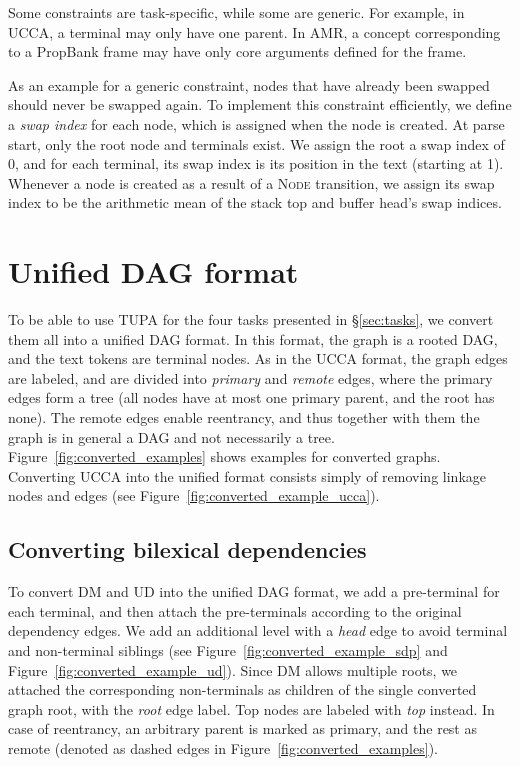 \documentclass[11pt,a4paper]{article}
\begin{document}
Some constraints are task-specific, while some are generic.
For example, in UCCA, a terminal may only have one parent.
In AMR, a concept corresponding to a PropBank frame may have only core arguments defined for the frame.

As an example for a generic constraint, nodes that have already been swapped
should never be swapped again.
To implement this constraint efficiently, we define a \textit{swap index}
for each node, which is assigned when the node is created.
At parse start, only the root node and terminals exist.
We assign the root a swap index of 0, and for each terminal, its swap index
is its position in the text (starting at 1).
Whenever a node is created as a result of a \textsc{Node}
transition, we assign its swap index to be the arithmetic mean of the stack top and buffer
head's swap indices.


\section{Unified DAG format}\label{sec:conversion}

To be able to use TUPA for the four tasks presented in \S\ref{sec:tasks},
we convert them all into a unified DAG format.
In this format, the graph is a rooted DAG, and the text tokens are terminal nodes.
As in the UCCA format, the graph edges are labeled,
and are divided into \textit{primary} and \textit{remote} edges,
where the primary edges form a tree (all nodes have at most one primary parent,
and the root has none).
The remote edges enable reentrancy, and thus together with them the graph
is in general a DAG and not necessarily a tree.
Figure~\ref{fig:converted_examples} shows examples for converted graphs.
Converting UCCA into the unified format consists simply of removing linkage nodes
and edges (see Figure~\ref{fig:converted_example_ucca}).

\subsection{Converting bilexical dependencies}
To convert DM and UD into the unified DAG format,
we add a pre-terminal for each terminal,
and then attach the pre-terminals according to the original dependency edges.
We add an additional level with a \textit{head} edge to avoid terminal and non-terminal siblings
(see Figure~\ref{fig:converted_example_sdp} and Figure~\ref{fig:converted_example_ud}).
Since DM allows multiple roots, we attached the corresponding non-terminals as children of
the single converted graph root, with the \textit{root} edge label.
Top nodes are labeled with \textit{top} instead.
In case of reentrancy, an arbitrary parent is marked as primary, and the rest as remote
(denoted as dashed edges in Figure~\ref{fig:converted_examples}).
\end{document}
